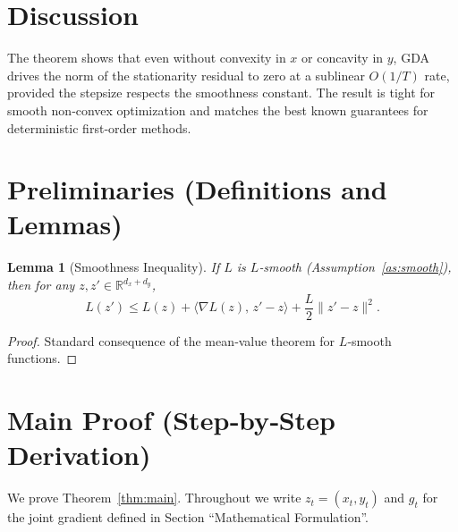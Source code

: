 \documentclass{article}
\newtheorem{lemma}{Lemma}
\newcommand{\grad}{\nabla}
\newcommand{\R}{\mathbb{R}}
\begin{document}
\section*{Discussion}
The theorem shows that even without convexity in $x$ or concavity in $y$, GDA drives the norm of the stationarity residual to zero at a sublinear $O(1/T)$ rate, provided the stepsize respects the smoothness constant.  The result is tight for smooth non‑convex optimization and matches the best known guarantees for deterministic first‑order methods.

\newpage

\section*{Preliminaries (Definitions and Lemmas)}
\begin{lemma}[Smoothness Inequality]\label{lem:smooth}
If $L$ is $L$‑smooth (Assumption~\ref{as:smooth}), then for any $z,z'\in\R^{d_x+d_y}$,
\[
L(z')\le L(z)+\langle\grad L(z),\,z'-z\rangle+\frac{L}{2}\|z'-z\|^{2}.
\]
\end{lemma}
\begin{proof}
Standard consequence of the mean‑value theorem for $L$‑smooth functions. \qedhere
\end{proof}

\section*{Main Proof (Step‑by‑Step Derivation)}
We prove Theorem~\ref{thm:main}.  Throughout we write $z_t=(x_t,y_t)$ and $g_t$ for the joint gradient defined in Section “Mathematical Formulation”.
\end{document}
